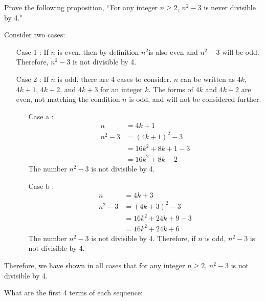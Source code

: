 \begin{questions}
\bonusquestion[4] Prove the following proposition, ``For any integer $n \geq 2$, $n^2-3$ is never divisible by 4."
    \ifprintanswers
        \vspace{-10pt}
    \fi
\begin{solution}
    Consider two cases:
    \begin{itemize}
        \item[Case 1]: If $n$ is even, then by definition $n^2$is also even and $n^2-3$ will be odd.  Therefore, $n^2-3$ is not divisible by 4.
        \item[Case 2]: If $n$ is odd, there are 4 cases to consider. $n$ can be written as $4k$, $4k+1$, $4k+2$, and $4k+3$ for an integer $k$.  The forms of $4k$ and $4k+2$ are even, not matching the condition $n$ is odd, and will not be considered further.
            \begin{itemize}
                \item[Case a]:
                \begin{align*}
                    n &= 4k + 1 \\
                    n^2 - 3 &= (4k + 1)^2 - 3 \\
                        &= 16k^2 + 8k + 1 - 3 \\
                        &= 16k^2 +8k - 2
                \end{align*}
                The number $n^2-3$ is not divisible by 4.
                \item[Case b]:
                \begin{align*}
                    n &= 4k+3 \\
                    n^2 - 3 &= (4k + 3)^2 - 3 \\
                     &= 16k^2 + 24k + 9 - 3 \\
                     &= 16k^2 + 24k + 6
                \end{align*}
                The number $n^2-3$ is not divisible by 4.
                Therefore, if $n$ is odd, $n^2-3$ is not divisible by 4.
            \end{itemize}
        \end{itemize}
        Therefore, we have shown in all cases that for any integer $n \geq 2$, $n^2 - 3$ is not divisible by 4.
\end{solution}




\ifprintanswers
  \newpage 
\fi 
{}

 What are the first 4 terms of each sequence:


\end{questions}
